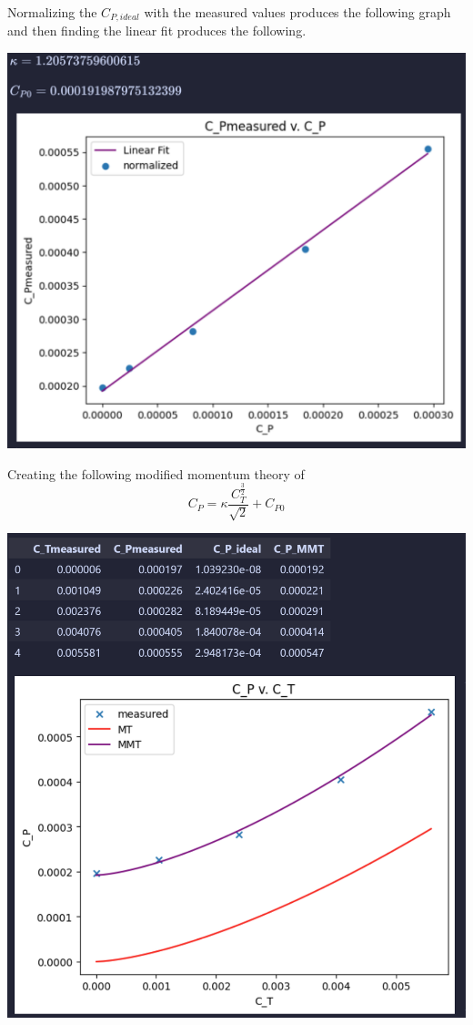 \documentclass[12pt]{exam}
\begin{document}
\begin{questions}
\begin{solutionorbox}[\stretch{1}]
\pagebreak
Normalizing the \(C_{P,ideal}\) with the measured values produces the following
graph and then finding the linear fit produces the following.

\includegraphics[width=\linewidth]{linear fit of cp.png}

\pagebreak
Creating the following modified momentum theory of 
\[C_P = \kappa\frac{C_T^{\frac{3}{2}}}{\sqrt{2}} + C_{P0}\]

\includegraphics[width=\linewidth]{cp v ct mmt.png}


\end{solutionorbox}
\end{questions}
\end{document}
